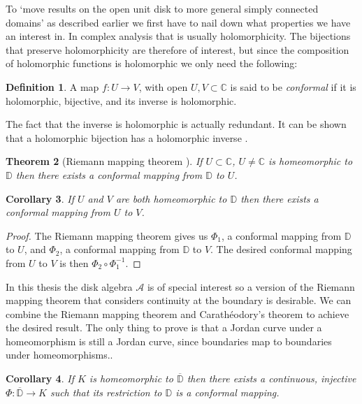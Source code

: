 \documentclass[a4paper,12pt,twoside,BCOR=10mm]{scrbook}
\newtheorem{theorem}{Theorem}[section]
\newtheorem{corollary}[theorem]{Corollary}
\theoremstyle{definition}
\theoremstyle{definition}
\theoremstyle{definition}
\newtheorem{definition}[theorem]{Definition}
\begin{document}
To `move results on the open unit disk to more general simply connected domains' as described earlier we first have to nail down what properties we have an interest in.
In complex analysis that is usually holomorphicity.
The bijections that preserve holomorphicity are therefore of interest, but since the composition of holomorphic functions is holomorphic we only need the following:
\begin{definition}
A map $f: U \rightarrow V$, with open $U, V \subset \mathbb{C}$ is said to be \emph{conformal} if it is holomorphic, bijective, and its inverse is holomorphic.
\end{definition}
The fact that the inverse is holomorphic is actually redundant.
It can be shown that a holomorphic bijection has a holomorphic inverse \citep{greenkrantz}.
\begin{theorem}[Riemann mapping theorem \citep{greenkrantz}]
If $U \subset \mathbb{C}$, $U \neq \mathbb{C}$ is homeomorphic to $\mathbb{D}$ then there exists a conformal mapping from $\mathbb{D}$ to $U$.
\end{theorem}
\begin{corollary}
If $U$ and $V$ are both homeomorphic to $\mathbb{D}$ then there exists a conformal mapping from $U$ to $V$.
\end{corollary}
\begin{proof}
The Riemann mapping theorem gives us $\Phi_1$, a conformal mapping from $\mathbb{D}$ to $U$, and $\Phi_2$, a conformal mapping from $\mathbb{D}$ to $V$.
The desired conformal mapping from $U$ to $V$ is then $\Phi_2 \circ \Phi_1^{-1}$.
\end{proof}
In this thesis the disk algebra $\mathcal{A}$ is of special interest so a version of the Riemann mapping theorem that considers continuity at the boundary is desirable.
We can combine the Riemann mapping theorem and Carathéodory's theorem to achieve the desired result.
The only thing to prove is that a Jordan curve under a homeomorphism is still a Jordan curve, since boundaries map to boundaries under homeomorphisms..
\begin{corollary}
\label{contrmt}
If $K$ is homeomorphic to $\overline{\mathbb{D}}$ then there exists a continuous, injective $\Phi: \overline{\mathbb{D}} \rightarrow K$ such that its restriction to $\mathbb{D}$ is a conformal mapping.
\end{corollary}
\end{document}
